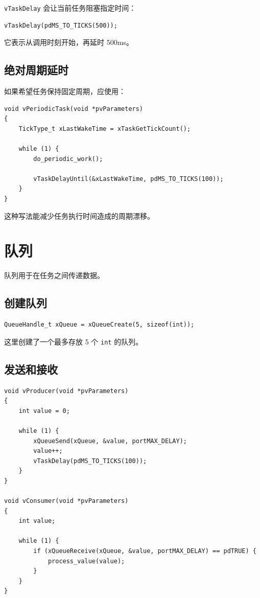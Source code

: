 \documentclass[12pt,a4paper]{ctexart}
\begin{document}
\texttt{vTaskDelay} 会让当前任务阻塞指定时间：

\begin{lstlisting}
vTaskDelay(pdMS_TO_TICKS(500));
\end{lstlisting}

它表示从调用时刻开始，再延时 500ms。

\subsection{绝对周期延时}

如果希望任务保持固定周期，应使用：

\begin{lstlisting}
void vPeriodicTask(void *pvParameters)
{
    TickType_t xLastWakeTime = xTaskGetTickCount();

    while (1) {
        do_periodic_work();

        vTaskDelayUntil(&xLastWakeTime, pdMS_TO_TICKS(100));
    }
}
\end{lstlisting}

这种写法能减少任务执行时间造成的周期漂移。

\section{队列}

队列用于在任务之间传递数据。

\subsection{创建队列}

\begin{lstlisting}
QueueHandle_t xQueue = xQueueCreate(5, sizeof(int));
\end{lstlisting}

这里创建了一个最多存放 5 个 \texttt{int} 的队列。

\subsection{发送和接收}

\begin{lstlisting}
void vProducer(void *pvParameters)
{
    int value = 0;

    while (1) {
        xQueueSend(xQueue, &value, portMAX_DELAY);
        value++;
        vTaskDelay(pdMS_TO_TICKS(100));
    }
}

void vConsumer(void *pvParameters)
{
    int value;

    while (1) {
        if (xQueueReceive(xQueue, &value, portMAX_DELAY) == pdTRUE) {
            process_value(value);
        }
    }
}
\end{lstlisting}
\end{document}
